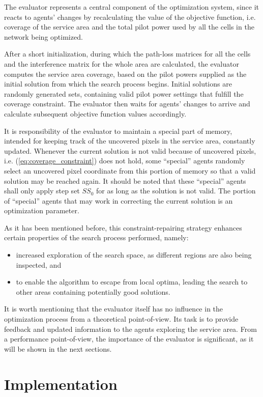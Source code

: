 The evaluator represents a central component of the optimization system,
since it reacts to agents' changes by recalculating the value of the
objective function, i.e. coverage of the service area and the total
pilot power used by all the cells in the network being optimized.

After a short initialization, during which the path-loss matrices
for all the cells and the interference matrix for the whole area are
calculated, the evaluator computes the service area coverage, based
on the pilot powers supplied as the initial solution from which the
search process begins. Initial solutions are randomly generated sets,
containing valid pilot power settings that fulfill the coverage constraint.
The evaluator then waits for agents' changes to arrive and calculate
subsequent objective function values accordingly.

It is responsibility of the evaluator to maintain a special part of
memory, intended for keeping track of the uncovered pixels in the
service area, constantly updated. Whenever the current solution is
not valid because of uncovered pixels, i.e. (\ref{eq:coverage_constraint})
does not hold, some ``special'' agents randomly select an uncovered
pixel coordinate from this portion of memory so that a valid solution
may be reached again. It should be noted that these ``special''
agents shall only apply step set $SS_{0}$ for as long as the solution
is not valid. The portion of ``special'' agents that may work in
correcting the current solution is an optimization parameter.

As it has been mentioned before, this constraint-repairing strategy
enhances certain properties of the search process performed, namely:
\begin{itemize}
\item increased exploration of the search space, as different regions are
also being inspected, and
\item to enable the algorithm to escape from local optima, leading the search
to other areas containing potentially good solutions.
\end{itemize}
It is worth mentioning that the evaluator itself has no influence
in the optimization process from a theoretical point-of-view. Its
task is to provide feedback and updated information to the agents
exploring the service area. From a performance point-of-view, the
importance of the evaluator is significant, as it will be shown in
the next sections.


\section{Implementation}

